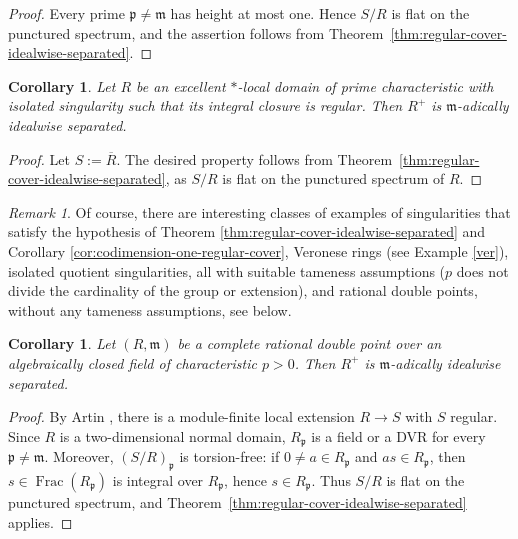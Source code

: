\documentclass[12pt,reqno]{amsart}
\newtheorem{corollary}[theorem]{Corollary}
\theoremstyle{definition}
\theoremstyle{remark}
\newtheorem{remark}[theorem]{Remark}
\theoremstyle{cited}
\theoremstyle{remark}
\theoremstyle{citeddef}
\DeclareMathOperator{\Frac}{Frac}
\newcommand{\fm}{\mathfrak{m}}
\newcommand{\fp}{\mathfrak{p}}
\begin{document}
	\begin{proof}
		Every prime $\fp\neq\fm$ has height at most one. Hence $S/R$ is flat on the
		punctured spectrum, and the assertion follows from
		Theorem~\ref{thm:regular-cover-idealwise-separated}.
	\end{proof}
	
	\begin{corollary}
		\label{cor:idealwise-separated}
		Let $R$ be an excellent $\ast$-local domain of prime characteristic with isolated singularity such that its integral closure is regular. Then  $R^+$ is $\mathfrak{m}$-adically idealwise separated.
	\end{corollary}
	
	\begin{proof} 
		Let $S:=\overline{R}$.
		The desired property follows  from Theorem~\ref{thm:regular-cover-idealwise-separated}, as $S/R$ is flat on the punctured spectrum of $R$.
	\end{proof}
	
	\begin{remark}
		Of course, there are interesting classes of examples of singularities that satisfy the hypothesis of Theorem \ref{thm:regular-cover-idealwise-separated} and  Corollary \ref{cor:codimension-one-regular-cover}, Veronese rings (see {Example} \ref{ver}), isolated quotient singularities, all with suitable tameness assumptions ($p$ does not divide the cardinality of the group or extension), and rational double points, without any tameness assumptions, see below.
	\end{remark}
	
	\begin{corollary}\label{cor:rdp-idealwise-separated}
		Let $(R,\fm)$ be a complete rational double point over an algebraically
		closed field of characteristic $p>0$. Then $R^+$ is $\fm$-adically
		idealwise separated.
	\end{corollary}
	
	\begin{proof}
		By Artin \cite[p.~11]{ArtRDP}, there is a module-finite
		local extension $R\to S$ with $S$ regular. Since $R$ is a two-dimensional
		normal domain, $R_{\fp}$ is a field or a DVR for every $\fp\neq\fm$.
		Moreover, $(S/R)_{\fp}$ is torsion-free: if $0\neq a\in R_{\fp}$ and
		$as\in R_{\fp}$, then $s\in\Frac(R_{\fp})$ is integral over $R_{\fp}$,
		hence $s\in R_{\fp}$. Thus $S/R$ is flat on the punctured spectrum, and
		Theorem~\ref{thm:regular-cover-idealwise-separated} applies.
	\end{proof}
	
\end{document}
